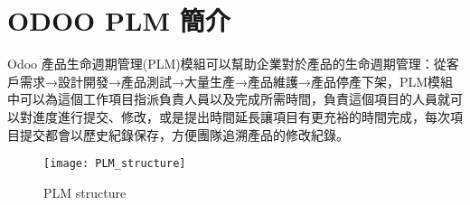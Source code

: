 \chapter{ODOO PLM 簡介}
\renewcommand{\baselinestretch}{10.0} %




\fontsize{14pt}{2.5pt}\sectionef\hspace{12pt}


Odoo 產品生命週期管理(PLM)模組可以幫助企業對於產品的生命週期管理：從客戶需求→設計開發→產品測試→大量生產→產品維護→產品停產下架，PLM模組中可以為這個工作項目指派負責人員以及完成所需時間，負責這個項目的人員就可以對進度進行提交、修改，或是提出時間延長讓項目有更充裕的時間完成，每次項目提交都會以歷史紀錄保存，方便團隊追溯產品的修改紀錄。\\




\begin{figure}[h!]
\begin{center}
\texttt{[image: PLM\_structure]}
\caption{\large PLM structure}
\label{PLM_structure}
\end{center}
\end{figure}









\newpage

\renewcommand{\baselinestretch}{0.5} %